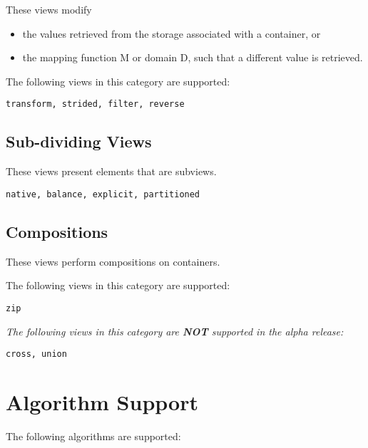 \documentclass{report}
\begin{document}
These views modify 
\begin{itemize}
\item
the values retrieved from the storage associated with a container, or
\item
the mapping function M or domain D, such that a different value is retrieved.
\end{itemize}
The following views in this category are supported:

{\tt transform, strided, filter, reverse }

\subsection{Sub-dividing Views}

\noindent
These views present elements that are subviews.

{\tt native, balance, explicit, partitioned }

\subsection{Compositions}

These views perform compositions on containers.

\noindent
The following views in this category are supported:

{\tt zip }

\vspace{0.4cm}

\noindent
\textit{ The following views in this category are {\bf NOT} supported 
in the alpha release:}

{\tt cross, union }


\section{Algorithm Support}

The following algorithms are supported:
\end{document}
